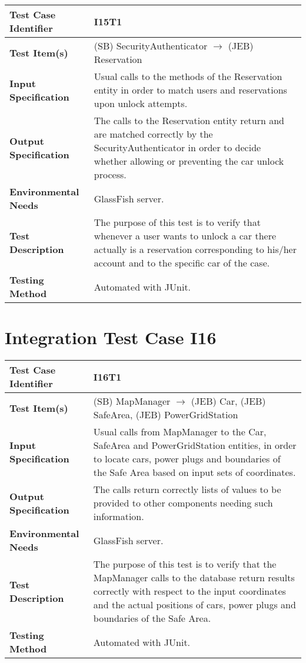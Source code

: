 \begin{longtable}{p{} | p{}}
\hline
\textbf{Test Case Identifier} & I15T1\\
\hline
\textbf{Test Item(s)} & (SB) SecurityAuthenticator $\rightarrow$ (JEB) Reservation \\
\hline
\textbf{Input Specification} & Usual calls to the methods of the Reservation entity in order to match users and reservations upon unlock attempts. \\
\hline
\textbf{Output Specification} & The calls to the Reservation entity return and are matched correctly by the SecurityAuthenticator in order to decide whether allowing or preventing the car unlock process. \\
\hline
\textbf{Environmental Needs} & GlassFish server. \\
\hline
\textbf{Test Description} & The purpose of this test is to verify that whenever a user wants to unlock a car there actually is a reservation corresponding to his/her account and to the specific car of the case. \\
\hline
\textbf{Testing Method} & Automated with JUnit. \\
\hline
\end{longtable}

\section{Integration Test Case I16}

\begin{longtable}{p{} | p{}}
\hline
\textbf{Test Case Identifier} & I16T1\\
\hline
\textbf{Test Item(s)} & (SB) MapManager $\rightarrow$ (JEB) Car, (JEB) SafeArea, (JEB) PowerGridStation \\
\hline
\textbf{Input Specification} & Usual calls from MapManager to the Car, SafeArea and PowerGridStation entities, in order to locate cars, power plugs and boundaries of the Safe Area based on input sets of coordinates. \\
\hline
\textbf{Output Specification} & The calls return correctly lists of values to be provided to other components needing such information. \\
\hline
\textbf{Environmental Needs} & GlassFish server. \\
\hline
\textbf{Test Description} & The purpose of this test is to verify that the MapManager calls to the database return results correctly with respect to the input coordinates and the actual positions of cars, power plugs and boundaries of the Safe Area. \\
\hline
\textbf{Testing Method} & Automated with JUnit. \\
\hline
\end{longtable}

